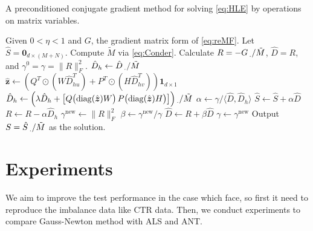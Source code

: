 \documentclass[11pt,twoside]{article}
\newcommand{\bsym}[1]{\ensuremath{\boldsymbol{#1}}}
\newcommand{\bz}{\ensuremath{\bsym{z}}}
\DeclareMathOperator*{\diag}{diag}
\begin{document}
\begin{algorithm}[t]
    \caption{A preconditioned conjugate gradient method for solving \eqref{eq:HLE} by operations on matrix variables.}
    \label{alg:Pcg}
    \begin{algorithmic}[1]
        \State Given $0<\eta<1$ and $G$, the gradient matrix form of \eqref{eq:reMF}. Let $\hat{S}=\bsym{0}_{d\times (M+N)}$.
        \State Compute $\tilde{M}$ via \eqref{eq:Conder}.
        \State Calculate $R = -G \prescript{}{\cdot}{/} \tilde{M}$, $\hat{D}=R$, and $\gamma^0=\gamma=\|R\|_F^2$.
            \State $\hat{D}_h \gets \hat{D} \prescript{}{\cdot}{/} \tilde{M}$
            \State $\hat{\bz}\gets \left( {Q^T}\odot{(W\hat{D}_{hu}^T)}+{P^T}\odot{(H\hat{D}_{hv}^T)} \right) \bsym{1}_{d\times 1}$
            \State $\hat{D}_h \gets \left(\lambda \hat{D}_h + \begin{bmatrix} Q \bigl(\diag(\hat{\bz}) W \bigr) \, P \bigl ( \diag(\hat{\bz}) H \bigr) \end{bmatrix}\right) \prescript{}{\cdot}{/} \tilde{M}$
            \State $\alpha \gets \gamma / \langle \hat{D},\hat{D}_h \rangle$
            \State $\hat{S} \gets\hat{S}+\alpha \hat{D}$
            \State $R \gets R-\alpha \hat{D}_h$
            \State $\gamma^{\text{new}} \gets \|R\|_F^2$
            \State $\beta \gets \gamma^{\text{new}}/\gamma$
            \State $\hat{D} \gets R+\beta \hat{D}$
            \State $\gamma \gets \gamma^{\text{new}}$
        \EndWhile
        \State Output $S=\hat{S} \prescript{}{\cdot}{/} \tilde{M}$ as the solution.
    \end{algorithmic}
\end{algorithm}

\section{Experiments}
We aim to improve the test performance in the case which \cite{test17a} face, so first it need to reproduce the imbalance data like CTR data. Then, we conduct experiments to compare Gauss-Newton method with ALS and ANT.  
\end{document}
